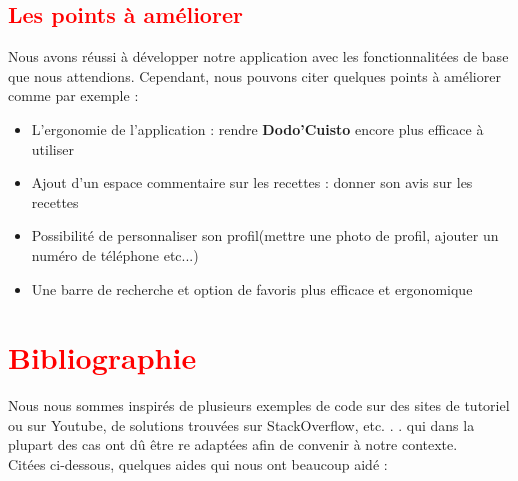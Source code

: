 \documentclass{article}
\begin{document}
\subsection{\textcolor{red}{Les points à améliorer}}

Nous avons réussi à développer notre application avec les fonctionnalitées de base que nous attendions. Cependant, nous pouvons citer quelques points à améliorer comme par exemple :

\begin{itemize}
    \item L’ergonomie de l’application : rendre \textbf{Dodo’Cuisto} encore plus efficace à utiliser
    \item Ajout d’un espace commentaire sur les recettes : donner son avis sur les recettes
    \item Possibilité de personnaliser son profil(mettre une photo de profil, ajouter un numéro de téléphone etc...)
    \item Une barre de recherche et option de favoris plus efficace et ergonomique
\end{itemize}


\section{\textcolor{red}{Bibliographie}}

\cite{androidDoc} 
\cite{SQLite}
\cite{androidDoc}
\cite{Image}
\cite{OpenClassRoomYoutube}
\cite{TutoAndroid}

Nous nous sommes inspirés de plusieurs exemples de code sur des sites de tutoriel ou sur Youtube, de solutions trouvées sur StackOverflow, etc. . . qui dans la plupart des cas ont dû être re adaptées afin de convenir à notre contexte.\\

Citées ci-dessous, quelques aides qui nous ont beaucoup aidé :



\end{document}
